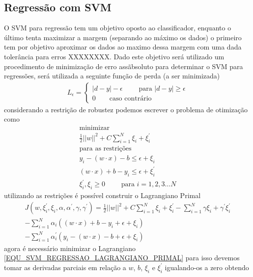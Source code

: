\subsection{Regressão com SVM}
O SVM para regressão tem um objetivo oposto ao classificador, enquanto o último tenta maximizar a margem (separando ao máximo os dados) o primeiro tem por objetivo aproximar os dados ao maximo dessa margem com uma dada tolerância para erros XXXXXXXX. Dado este objetivo será utilizado um procedimento de minimização de erro assãbsoluto para determinar o SVM para regressões, será utilizada a seguinte função de perda (a ser minimizada)
\begin{align}
L_{\epsilon} = 	\begin{cases}
						|d - y| - \epsilon  \qquad	\textrm{ para } |d - y| \geq \epsilon \\
						0					\qquad	\textrm{caso contrário}
				\end{cases}
\end{align}
considerando a restrição de robustez podemos escrever o problema de otimização como
\begin{align}
\nonumber \textrm{minimizar}\\
\frac{1}{2}||w||^{2} + C \sum\limits_{i=1}^{N} \xi_{i} + \xi_{i}^{'}\\
\nonumber \textrm{para as restrições}\\
y_{i} - (w \cdot x) - b \leq \epsilon + \xi_{i}\\
(w \cdot x) + b - y_{i}  \leq \epsilon + \xi_{i}^{'}\\
\xi_{i}^{'}, \xi_{i} \geq 0 \qquad \textrm{ para } i =1, 2, 3 \ldots N
\end{align}
utilizando as restrições é possível construir o Lagrangiano Primal
\begin{align}
J(w,\xi_{i}^{'}, \xi_{i}, \alpha, \alpha^{'}, \gamma, \gamma^{'}) = \frac{1}{2}||w||^{2} + C \sum\limits_{i=1}^{N} \xi_{i} + \xi_{i}^{'} - \sum\limits_{i=1}^{N} \gamma\xi_{i} + \gamma^{'}\xi_{i}^{'} \\
-\sum\limits_{i=1}^{N}\alpha_{i}((w \cdot x) + b - y_{i}+ \epsilon + \xi_{i}) \\
- \sum\limits_{i=1}^{N}\alpha_{i}^{'}(y_{i} - (w \cdot x) - b +\epsilon + \xi_{i}) \label{EQU_SVM_REGRESSAO_LAGRANGIANO_PRIMAL}
\end{align}
agora é necessário minimizar o Lagrangiano \eqref{EQU_SVM_REGRESSAO_LAGRANGIANO_PRIMAL} para isso devemos tomar as derivadas parciais em relação a \(w\), \(b\), \(\xi_{i}\) e \(\xi_{i}^{'}\) igualando-os a zero obtendo
